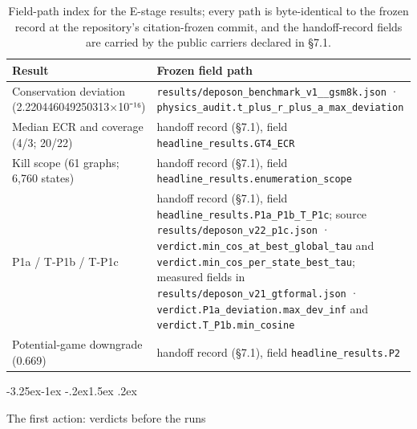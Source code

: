 \documentclass[11pt,a4paper]{article}
\makeatletter
\renewcommand\subsection{\@startsection{subsection}{2}{\z@}%
  {-3.25ex\@plus -1ex \@minus -.2ex}{1.5ex \@plus .2ex}%
  {\normalfont\large\bfseries\raggedright}}
\makeatother
\begin{document}
\begin{table}[htbp]
\centering
\small
\setlength{\tabcolsep}{4pt}
\renewcommand{\arraystretch}{1.15}
\begin{tabularx}{0.985\textwidth}{@{}>{\raggedright\arraybackslash}p{}>{\raggedright\arraybackslash}X@{}}
\toprule
\textbf{Result} & \textbf{Frozen field path} \\
\midrule
Conservation deviation (2.220446049250313\allowbreak ×10⁻¹⁶) & \texttt{results/\allowbreak deposon\_\allowbreak benchmark\_\allowbreak v1\_\allowbreak 4\_\allowbreak gsm8k.json} · \texttt{physics\_\allowbreak audit.t\_\allowbreak plus\_\allowbreak r\_\allowbreak plus\_\allowbreak a\_\allowbreak max\_\allowbreak deviation} \\
Median ECR and coverage (4/3; 20/22) & handoff record (§7.1), field \texttt{headline\_\allowbreak results.GT4\_\allowbreak ECR} \\
Kill scope (61 graphs; 6,760 states) & handoff record (§7.1), field \texttt{headline\_\allowbreak results.enumeration\_\allowbreak scope} \\
P1a / T-P1b / T-P1c & handoff record (§7.1), field \texttt{headline\_\allowbreak results.P1a\_\allowbreak P1b\_\allowbreak T\_\allowbreak P1c}; source \texttt{results/\allowbreak deposon\_\allowbreak v22\_\allowbreak p1c.json} · \texttt{verdict.min\_\allowbreak cos\_\allowbreak at\_\allowbreak best\_\allowbreak global\_\allowbreak tau} and \texttt{verdict.min\_\allowbreak cos\_\allowbreak per\_\allowbreak state\_\allowbreak best\_\allowbreak tau}; measured fields in \texttt{results/\allowbreak deposon\_\allowbreak v21\_\allowbreak gtformal.json} · \texttt{verdict.P1a\_\allowbreak deviation.max\_\allowbreak dev\_\allowbreak inf} and \texttt{verdict.T\_\allowbreak P1b.min\_\allowbreak cosine} \\
Potential-game downgrade (0.669) & handoff record (§7.1), field \texttt{headline\_\allowbreak results.P2} \\
\bottomrule
\end{tabularx}
\caption{Field-path index for the E-stage results; every path is byte-identical to the frozen record at the repository's citation-frozen commit, and the handoff-record fields are carried by the public carriers declared in §7.1.}
\label{tab:fieldpathsE}
\end{table}

\subsection{The first action: verdicts before the runs}
\end{document}

